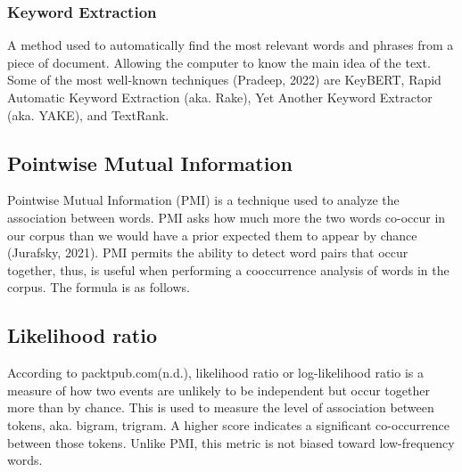 \documentclass[12pt,oneside,openright,a4paper]{cpe-english-project}
\begin{document}
\subsubsection{Keyword Extraction}
A method used to automatically find the most relevant words and phrases from a piece of document\cite{f}. Allowing the computer to know the main idea of the text. Some of the most well-known techniques (Pradeep, 2022) are KeyBERT, Rapid Automatic Keyword Extraction (aka. Rake), Yet Another Keyword Extractor (aka. YAKE), and TextRank.

\subsection{Pointwise Mutual Information}
Pointwise Mutual Information (PMI) is a technique used to analyze the association between words. PMI asks how much more the two words co-occur in our corpus than we would have a prior expected them to appear by chance (Jurafsky, 2021)\cite{e}. PMI permits the ability to detect word pairs that occur together, thus, is useful when performing a cooccurrence analysis of words in the corpus. The formula is as follows.

\subsection{Likelihood ratio}
	According to packtpub.com(n.d.), likelihood ratio or log-likelihood ratio is a measure of how two events are unlikely to be independent but occur together more than by chance. This is used to measure the level of association between tokens, aka. bigram, trigram. A higher score indicates a significant co-occurrence between those tokens. Unlike PMI, this metric is not biased toward low-frequency words.
\end{document}
